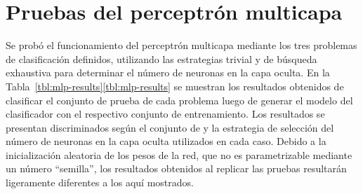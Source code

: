 %
%
%
\section{Pruebas del perceptrón multicapa}
%
Se probó el funcionamiento del perceptrón multicapa mediante los tres
problemas de clasificación definidos, utilizando las estrategias
trivial y de búsqueda exhaustiva para determinar el número de neuronas
en la capa oculta.
En la \iflatexml{}Tabla~\ref{tbl:mlp-results}\else\autoref{tbl:mlp-results}\fi{}
se muestran los resultados obtenidos de clasificar el conjunto de
prueba de cada problema luego de generar el modelo del clasificador
con el respectivo conjunto de entrenamiento.
Los resultados se presentan discriminados según el conjunto de
 y la estrategia de selección del número de neuronas en la
capa oculta utilizados en cada caso.
Debido a la inicialización aleatoria de los pesos de la red, que no es
parametrizable mediante un número ``semilla'', los resultados
obtenidos al replicar las pruebas resultarán ligeramente diferentes a
los aquí mostrados.
